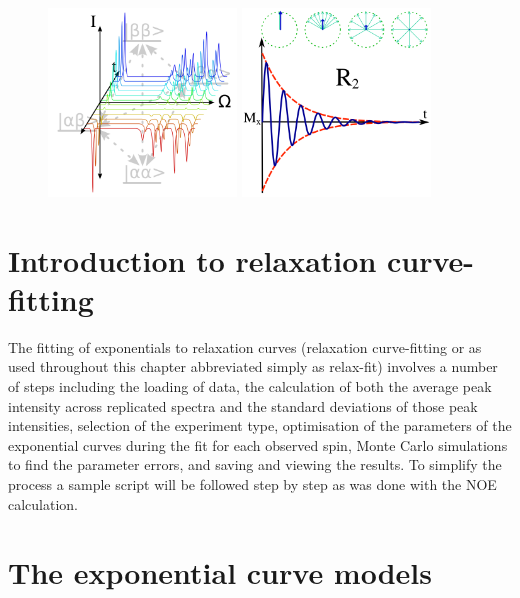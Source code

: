 \begin{figure}[h]
  \includegraphics[width=5cm, bb=0 0 1701 1701]{graphics/analyses/r1_600x600} \hfill \includegraphics[width=5cm, bb=0 0 1701 1701]{graphics/analyses/r2_600x600}
\end{figure}



\section{Introduction to relaxation curve-fitting}

The fitting of exponentials to relaxation curves (relaxation curve-fitting or as used throughout this chapter abbreviated simply as relax-fit) involves a number of steps including the loading of data, the calculation of both the average peak intensity across replicated spectra and the standard deviations of those peak intensities, selection of the experiment type, optimisation of the parameters of the exponential curves during the fit for each observed spin, Monte Carlo simulations to find the parameter errors, and saving and viewing the results.
To simplify the process a sample script will be followed step by step as was done with the NOE calculation.




\section{The exponential curve models}
\label{sect: exponential curve models}

